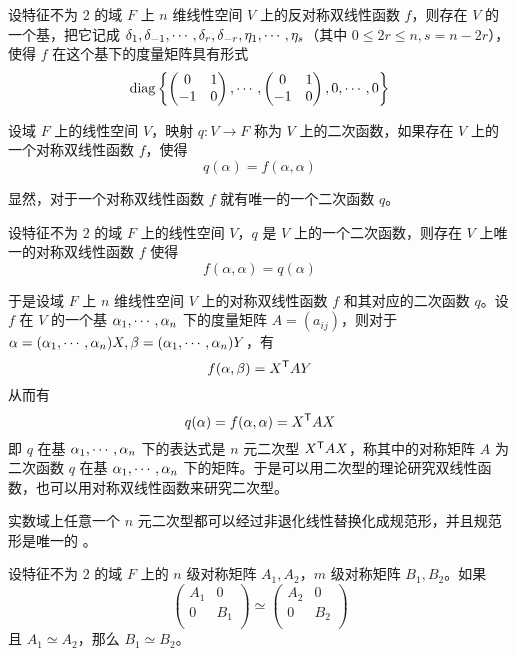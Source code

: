 \begin{theorem}
	设特征不为 $2$ 的域 $F$ 上 $n$ 维线性空间 $V$ 上的反对称双线性函数 $f$，则存在 $V$ 的一个基，把它记成 $\delta_{1},\delta_{-1},\cdots,\delta_{r},\delta_{-r},\eta_1,\cdots,\eta_s$（其中 $0 \leqslant 2r \leqslant n, s = n-2r$），使得 $f$ 在这个基下的度量矩阵具有形式
	\[ \operatorname{diag}\left\{
		\left(\begin{matrix} 0 & 1 \\ -1 & 0 \end{matrix}\right),
		\cdots,
		\left(\begin{matrix} 0 & 1 \\ -1 & 0 \end{matrix}\right),
		0,\cdots,0
		\right\} \]
\end{theorem}

\begin{definition}
	设域 $F$ 上的线性空间 $V$，映射 $q : V \to F$ 称为 $V$ 上的二次函数，如果存在 $V$ 上的一个对称双线性函数 $f$，使得
	\[ q(\alpha) = f(\alpha,\alpha) \]
\end{definition}

显然，对于一个对称双线性函数 $f$ 就有唯一的一个二次函数 $q$。

\begin{theorem}
	设特征不为 $2$ 的域 $F$ 上的线性空间 $V$，$q$ 是 $V$ 上的一个二次函数，则存在 $V$ 上唯一的对称双线性函数 $f$ 使得
	\[ f(\alpha,\alpha) = q(\alpha) \]
\end{theorem}

于是设域 $F$ 上 $n$ 维线性空间 $V$ 上的对称双线性函数 $f$ 和其对应的二次函数 $q$。设 $f$ 在 $V$ 的一个基 $\alpha_1,\cdots,\alpha_n$ 下的度量矩阵 $A = (a_{ij})$，则对于 $\alpha = (\alpha_1,\cdots,\alpha_n)X,\beta = (\alpha_1,\cdots,\alpha_n)Y$，有
\[ f(\alpha,\beta) = {X}^\mathsf{T}AY \]
从而有
\[ q(\alpha) = f(\alpha,\alpha) = {X}^\mathsf{T}AX \]
即 $q$ 在基 $\alpha_1,\cdots,\alpha_n$ 下的表达式是 $n$ 元二次型 ${X}^\mathsf{T}AX$，称其中的对称矩阵 $A$ 为二次函数 $q$ 在基 $\alpha_1,\cdots,\alpha_n$ 下的矩阵。于是可以用二次型的理论研究双线性函数，也可以用对称双线性函数来研究二次型。

\begin{theorem}[惯性定理]
	实数域上任意一个 $n$ 元二次型都可以经过非退化线性替换化成规范形，并且规范形是唯一的 。
\end{theorem}

\begin{theorem}
	设特征不为 $2$ 的域 $F$ 上的 $n$ 级对称矩阵 $A_1,A_2$，$m$ 级对称矩阵 $B_1,B_2$。如果
	\[ \left(\begin{matrix}
				A_1 & 0   \\
				0   & B_1 \\
			\end{matrix}\right) \simeq \left(\begin{matrix}
				A_2 & 0   \\
				0   & B_2 \\
			\end{matrix}\right) \]
	且 $A_1 \simeq A_2$，那么 $B_1 \simeq B_2$。
\end{theorem}

